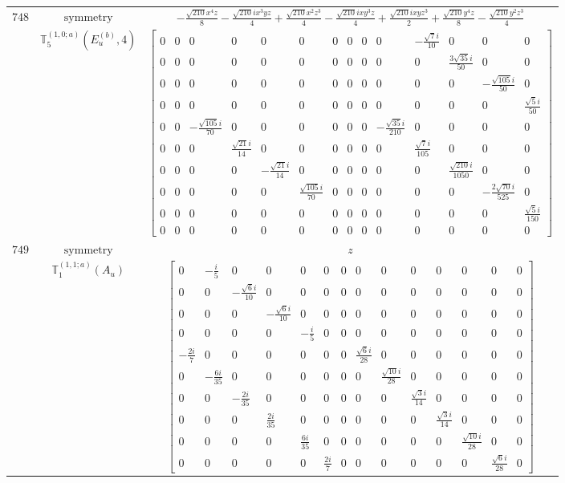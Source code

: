 \documentclass[fleqn,8pt,landscape]{jsarticle}
\begin{document}
\begin{longtable}{ccc}
$ 748 $ & $ \text{symmetry} $ & $ - \frac{\sqrt{210} x^{4} z}{8} - \frac{\sqrt{210} i x^{3} y z}{4} + \frac{\sqrt{210} x^{2} z^{3}}{4} - \frac{\sqrt{210} i x y^{3} z}{4} + \frac{\sqrt{210} i x y z^{3}}{2} + \frac{\sqrt{210} y^{4} z}{8} - \frac{\sqrt{210} y^{2} z^{3}}{4} $ \\
$  $ & $ \mathbb{T}_{5}^{(1,0;a)}(E_{u}^{(b)},4) $ & $ \begin{bmatrix} 0 & 0 & 0 & 0 & 0 & 0 & 0 & 0 & 0 & 0 & - \frac{\sqrt{7} i}{10} & 0 & 0 & 0 \\ 0 & 0 & 0 & 0 & 0 & 0 & 0 & 0 & 0 & 0 & 0 & \frac{3 \sqrt{35} i}{50} & 0 & 0 \\ 0 & 0 & 0 & 0 & 0 & 0 & 0 & 0 & 0 & 0 & 0 & 0 & - \frac{\sqrt{105} i}{50} & 0 \\ 0 & 0 & 0 & 0 & 0 & 0 & 0 & 0 & 0 & 0 & 0 & 0 & 0 & \frac{\sqrt{5} i}{50} \\ 0 & 0 & - \frac{\sqrt{105} i}{70} & 0 & 0 & 0 & 0 & 0 & 0 & - \frac{\sqrt{35} i}{210} & 0 & 0 & 0 & 0 \\ 0 & 0 & 0 & \frac{\sqrt{21} i}{14} & 0 & 0 & 0 & 0 & 0 & 0 & \frac{\sqrt{7} i}{105} & 0 & 0 & 0 \\ 0 & 0 & 0 & 0 & - \frac{\sqrt{21} i}{14} & 0 & 0 & 0 & 0 & 0 & 0 & \frac{\sqrt{210} i}{1050} & 0 & 0 \\ 0 & 0 & 0 & 0 & 0 & \frac{\sqrt{105} i}{70} & 0 & 0 & 0 & 0 & 0 & 0 & - \frac{2 \sqrt{70} i}{525} & 0 \\ 0 & 0 & 0 & 0 & 0 & 0 & 0 & 0 & 0 & 0 & 0 & 0 & 0 & \frac{\sqrt{5} i}{150} \\ 0 & 0 & 0 & 0 & 0 & 0 & 0 & 0 & 0 & 0 & 0 & 0 & 0 & 0 \end{bmatrix} $ \\ \hline
$ 749 $ & $ \text{symmetry} $ & $ z $ \\
$  $ & $ \mathbb{T}_{1}^{(1,1;a)}(A_{u}) $ & $ \begin{bmatrix} 0 & - \frac{i}{5} & 0 & 0 & 0 & 0 & 0 & 0 & 0 & 0 & 0 & 0 & 0 & 0 \\ 0 & 0 & - \frac{\sqrt{6} i}{10} & 0 & 0 & 0 & 0 & 0 & 0 & 0 & 0 & 0 & 0 & 0 \\ 0 & 0 & 0 & - \frac{\sqrt{6} i}{10} & 0 & 0 & 0 & 0 & 0 & 0 & 0 & 0 & 0 & 0 \\ 0 & 0 & 0 & 0 & - \frac{i}{5} & 0 & 0 & 0 & 0 & 0 & 0 & 0 & 0 & 0 \\ - \frac{2 i}{7} & 0 & 0 & 0 & 0 & 0 & 0 & \frac{\sqrt{6} i}{28} & 0 & 0 & 0 & 0 & 0 & 0 \\ 0 & - \frac{6 i}{35} & 0 & 0 & 0 & 0 & 0 & 0 & \frac{\sqrt{10} i}{28} & 0 & 0 & 0 & 0 & 0 \\ 0 & 0 & - \frac{2 i}{35} & 0 & 0 & 0 & 0 & 0 & 0 & \frac{\sqrt{3} i}{14} & 0 & 0 & 0 & 0 \\ 0 & 0 & 0 & \frac{2 i}{35} & 0 & 0 & 0 & 0 & 0 & 0 & \frac{\sqrt{3} i}{14} & 0 & 0 & 0 \\ 0 & 0 & 0 & 0 & \frac{6 i}{35} & 0 & 0 & 0 & 0 & 0 & 0 & \frac{\sqrt{10} i}{28} & 0 & 0 \\ 0 & 0 & 0 & 0 & 0 & \frac{2 i}{7} & 0 & 0 & 0 & 0 & 0 & 0 & \frac{\sqrt{6} i}{28} & 0 \end{bmatrix} $ \\ \hline

\end{longtable}
\end{document}
